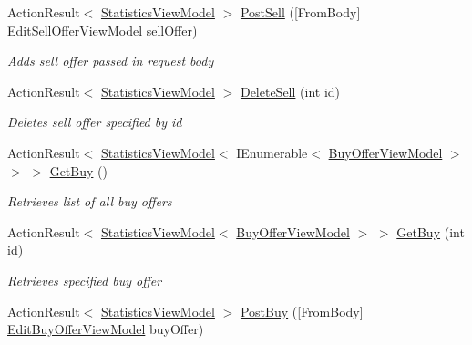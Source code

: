 \begin{DoxyCompactItemize}
Action\+Result$<$ \mbox{\hyperlink{class_gielda_l2_1_1_a_p_i_1_1_view_models_1_1_view_1_1_statistics_view_model}{Statistics\+View\+Model}} $>$ \mbox{\hyperlink{class_gielda_l2_1_1_a_p_i_1_1_controllers_1_1_offers_controller_a30bc8e1a4fcc81aa32fff84c054bfb3f}{Post\+Sell}} (\mbox{[}From\+Body\mbox{]} \mbox{\hyperlink{class_gielda_l2_1_1_a_p_i_1_1_view_models_1_1_edit_1_1_edit_sell_offer_view_model}{Edit\+Sell\+Offer\+View\+Model}} sell\+Offer)
\begin{DoxyCompactList}\small\item\em Adds sell offer passed in request body \end{DoxyCompactList}\item 
Action\+Result$<$ \mbox{\hyperlink{class_gielda_l2_1_1_a_p_i_1_1_view_models_1_1_view_1_1_statistics_view_model}{Statistics\+View\+Model}} $>$ \mbox{\hyperlink{class_gielda_l2_1_1_a_p_i_1_1_controllers_1_1_offers_controller_a8290b7e739c2756489ff7d00b160fb82}{Delete\+Sell}} (int id)
\begin{DoxyCompactList}\small\item\em Deletes sell offer specified by id \end{DoxyCompactList}\item 
Action\+Result$<$ \mbox{\hyperlink{class_gielda_l2_1_1_a_p_i_1_1_view_models_1_1_view_1_1_statistics_view_model}{Statistics\+View\+Model}}$<$ I\+Enumerable$<$ \mbox{\hyperlink{class_gielda_l2_1_1_a_p_i_1_1_view_models_1_1_view_1_1_buy_offer_view_model}{Buy\+Offer\+View\+Model}} $>$ $>$ $>$ \mbox{\hyperlink{class_gielda_l2_1_1_a_p_i_1_1_controllers_1_1_offers_controller_a0c19e9a3ee9a48231d20f52d57048c22}{Get\+Buy}} ()
\begin{DoxyCompactList}\small\item\em Retrieves list of all buy offers \end{DoxyCompactList}\item 
Action\+Result$<$ \mbox{\hyperlink{class_gielda_l2_1_1_a_p_i_1_1_view_models_1_1_view_1_1_statistics_view_model}{Statistics\+View\+Model}}$<$ \mbox{\hyperlink{class_gielda_l2_1_1_a_p_i_1_1_view_models_1_1_view_1_1_buy_offer_view_model}{Buy\+Offer\+View\+Model}} $>$ $>$ \mbox{\hyperlink{class_gielda_l2_1_1_a_p_i_1_1_controllers_1_1_offers_controller_a1310ed7960becb921d6b9285ae375c95}{Get\+Buy}} (int id)
\begin{DoxyCompactList}\small\item\em Retrieves specified buy offer \end{DoxyCompactList}\item 
Action\+Result$<$ \mbox{\hyperlink{class_gielda_l2_1_1_a_p_i_1_1_view_models_1_1_view_1_1_statistics_view_model}{Statistics\+View\+Model}} $>$ \mbox{\hyperlink{class_gielda_l2_1_1_a_p_i_1_1_controllers_1_1_offers_controller_a2c53fc87e733d63b5f3f634ad716689b}{Post\+Buy}} (\mbox{[}From\+Body\mbox{]} \mbox{\hyperlink{class_gielda_l2_1_1_a_p_i_1_1_view_models_1_1_edit_1_1_edit_buy_offer_view_model}{Edit\+Buy\+Offer\+View\+Model}} buy\+Offer)

\end{DoxyCompactItemize}
